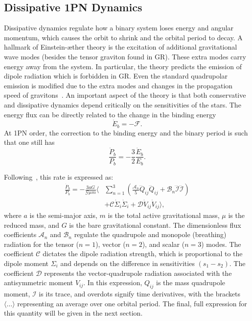 \documentclass[
    floats,
    floatfix,
    amssymb,
    prd,
    twocolumn,
    superscriptaddress,
    nofootinbib,
    unicode,
    colorlinks=true,
    linktocpage=true
]{revtex4-2}
\begin{document}
\subsection{Dissipative 1PN Dynamics}
Dissipative dynamics regulate how a binary system loses energy and angular momentum, which causes the orbit to shrink and the orbital period to decay.  A hallmark of Einstein-\ae ther theory is the excitation of additional gravitational wave modes (besides the tensor graviton found in GR). These extra modes carry energy away from the system. In particular, the theory predicts the emission of dipole radiation which  is forbidden in GR. Even the standard quadrupolar emission is modified  due to the extra modes and changes in the propagation speed of gravitons~\cite{Yagi_2014}. An important aspect of the theory is that both conservative and dissipative dynamics depend critically on the sensitivities of the stars. 
The energy flux can be directly related to the change in the binding energy
\begin{equation}
\dot{E}_b = -\mathcal{F}.
\label{eq:balance}
\end{equation}
At 1PN order, the correction to the binding energy and the binary period is such that one still has
\begin{equation}
\frac{\dot{P}_b}{P_b} = -\frac{3}{2}\frac{\dot{E}_b}{E_b}.
\end{equation}

Following~\cite{Yagi_2014}, this rate is expressed as:
\begin{equation}
\label{eq:PbDot_ae}
\begin{split}
\frac{\dot{P}_b}{P_b} = -\frac{3aG}{\mathcal{G}\mu m} \bigg\langle
&\sum_{n=1}^3 \left( \frac{\mathcal{A}_n}{5} \dddot{Q}_{ij} \dddot{Q}_{ij} + 
\mathcal{B}_n \dddot{\mathcal{I}} \dddot{\mathcal{I}} \right) \\
&+ \mathcal{C} \dot{\Sigma}_i \dot{\Sigma}_i + \mathcal{D} \dot{V}_{ij} 
\dot{V}_{ij} \bigg\rangle,
\end{split}
\end{equation}
where $a$ is the semi-major axis, $m$ is the total active gravitational mass, $\mu$ is the reduced mass, and $G$ is the bare gravitational constant. The dimensionless flux coefficients $\mathcal{A}_n$ and $\mathcal{B}_n$ regulate the quadrupole and monopole (breathing) radiation for the tensor ($n=1$), vector ($n=2$), and scalar ($n=3$) modes. The coefficient $\mathcal{C}$ dictates the dipole radiation strength, which is proportional to the dipole moment $\Sigma_i$ and depends on the difference in sensitivities $(s_1 - s_2)$. The coefficient 
$\mathcal{D}$ represents the vector-quadrupole radiation associated with the antisymmetric moment $V_{ij}$. In this expression, $Q_{ij}$ is the mass 
quadrupole moment, $\mathcal{I}$ is its trace, and overdots signify time  derivatives, with the brackets $\langle \dots \rangle$ representing an  average over one orbital period. The final, full expression for this quantity will be given in the next section.
\end{document}
